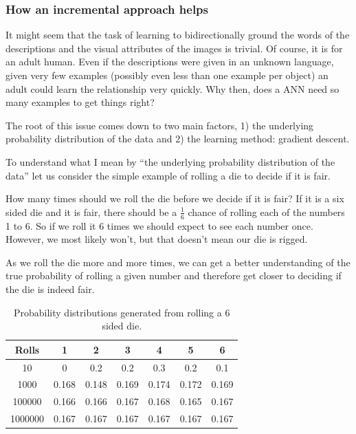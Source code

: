 \subsubsection{How an incremental approach helps}
It might seem that the task of learning to bidirectionally ground the words of the descriptions and the visual attributes of the images is trivial. Of course, it is for an adult human. Even if the descriptions were given in an unknown language, given very few examples (possibly even less than one example per object) an adult could learn the relationship very quickly. Why then, does a \ac{ANN} need so many examples to get things right?

The root of this issue comes down to two main factors, 1) the underlying probability distribution of the data and 2) the learning method: gradient descent.

To understand what I mean by ``the underlying probability distribution of the data'' let us consider the simple example of rolling a die to decide if it is fair.

How many times should we roll the die before we decide if it is fair? If it is a six sided die and it is fair, there should be a $\frac{1}{6}$ chance of rolling each of the numbers 1 to 6. So if we roll it 6 times we should expect to see each number once. However, we most likely won't, but that doesn't mean our die is rigged.

As we roll the die more and more times, we can get a better understanding of the true probability of rolling a given number and therefore get closer to deciding if the die is indeed fair.

\begin{table}[h]
\centering
	\begin{tabular}{|c|c|c|c|c|c|c|}
	\hline
	\textbf{Rolls} & \textbf{1} & \textbf{2} & \textbf{3} & \textbf{4} & \textbf{5} & \textbf{6} \\ \hline
	10 & 0 & 0.2 & 0.2 & 0.3 & 0.2 & 0.1 \\ \hline
	1000 & 0.168 & 0.148 & 0.169 & 0.174 & 0.172 & 0.169  \\ \hline
	100000 & 0.166 & 0.166 & 0.167 & 0.168 & 0.165 & 0.167  \\ \hline
	1000000 & 0.167 & 0.167 & 0.167 & 0.167 & 0.167 & 0.167  \\ \hline
	\end{tabular}
	\caption{Probability distributions generated from rolling a 6 sided die.}
	\label{tab:dieProb}
\end{table}

